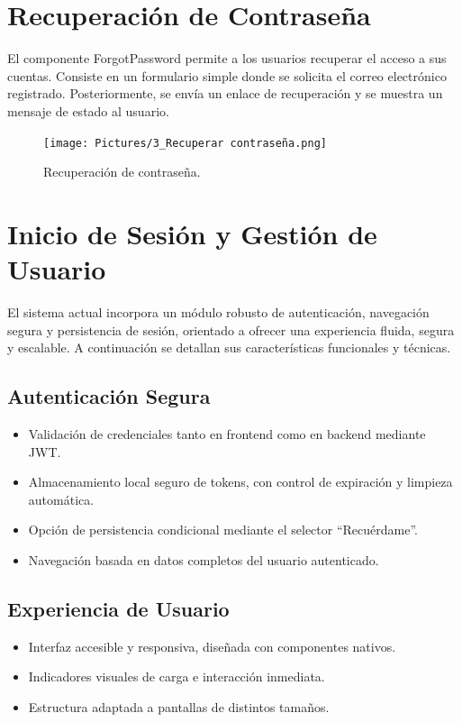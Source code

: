 \documentclass[11pt, a4paper, oneside]{book}
\begin{document}
    \section{Recuperación de Contraseña}
    El componente ForgotPassword permite a los usuarios recuperar el acceso a sus cuentas. Consiste en un formulario simple donde se solicita el correo electrónico registrado. Posteriormente, se envía un enlace de recuperación y se muestra un mensaje de estado al usuario.
    
    \begin{figure}[H]
    \centering
    \texttt{[image: Pictures/3\_Recuperar contraseña.png]}
    \caption{\label{fig:frog}Recuperación de contraseña.}
    \end{figure}

    \section{Inicio de Sesión y Gestión de Usuario}

El sistema actual incorpora un módulo robusto de autenticación, navegación segura y persistencia de sesión, orientado a ofrecer una experiencia fluida, segura y escalable. A continuación se detallan sus características funcionales y técnicas.

\subsection*{Autenticación Segura}

\begin{itemize}
    \item Validación de credenciales tanto en frontend como en backend mediante JWT.
    \item Almacenamiento local seguro de tokens, con control de expiración y limpieza automática.
    \item Opción de persistencia condicional mediante el selector ``Recuérdame''.
    \item Navegación basada en datos completos del usuario autenticado.
\end{itemize}

\subsection*{Experiencia de Usuario}

\begin{itemize}
    \item Interfaz accesible y responsiva, diseñada con componentes nativos.
    \item Indicadores visuales de carga e interacción inmediata.
    \item Estructura adaptada a pantallas de distintos tamaños.
\end{itemize}
\end{document}
